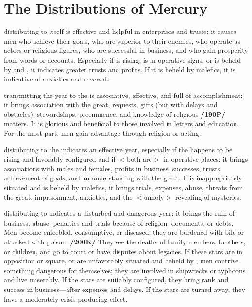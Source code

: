 \section{The Distributions of Mercury}

\Mercury\xspace distributing to itself is effective and helpful in enterprises and trusts: it causes men who achieve their goals, who are superior to their enemies, who operate as actors or religious figures, who are successful in business, and who gain prosperity from words or accounts. Especially if \Mercury\xspace is rising, is in operative signs, or is beheld by \Jupiter\xspace and \Venus, it indicates greater trusts and profits. If it is beheld by malefics, it is indicative of anxieties and reversals.

\Mercury\xspace transmitting the year to the \Sun\xspace is associative, effective, and full of accomplishment: it brings
association with the great, requests, gifts (but with delays and obstacles), stewardships, preeminence, and knowledge of religious \textbf{/190P/} matters. It is glorious and beneficial to those involved in letters and education. For the most part, men gain advantage through religion or acting.

\Mercury\xspace distributing to the\Moon\xspace indicates an effective year, especially if the \Moon\xspace happens to be
rising and favorably configured and if $<$both are$>$ in operative places: it brings associations with males and
females, profits in business, successes, trusts, achievement of goals, and an understanding with the great. If \Mercury\xspace is inappropriately situated and is beheld by malefics, it brings trials, expenses, abuse, threats from the great, imprisonment, anxieties, and the $<$unholy$>$ revealing of mysteries.

\Mercury\xspace distributing to \Saturn\xspace indicates a disturbed and dangerous year: it brings the ruin of business,
abuse, penalties and trials because of religion, documents, or debts. Men become enfeebled, consumptive, or diseased; they are burdened with bile or attacked with poison. \textbf{/200K/} They see the deaths of family members, brothers, or children, and go to court or have disputes about legacies. If these stars are in opposition or square, or are unfavorably situated and beheld by \Mars, men contrive something dangerous for themselves; they are involved in shipwrecks or typhoons and live miserably. If the stars are suitably configured, they bring rank and success in business—after expenses and delays. If the stars are turned away, they have a moderately crisis-producing effect.

